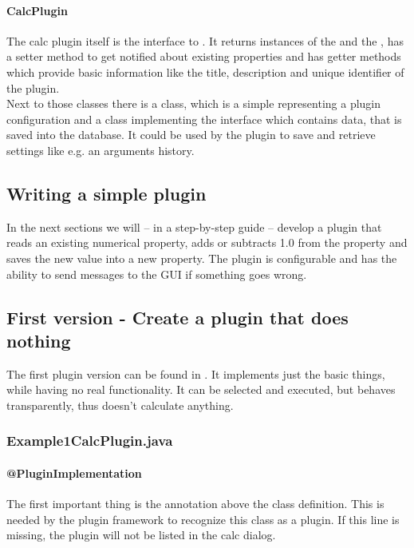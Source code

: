   \paragraph{CalcPlugin}
  The calc plugin itself is the interface to \sh.
  It returns instances of the 
  and the ,
  has a setter method to get notified about existing properties and
  has getter methods which provide basic information like the title,
  description and unique identifier of the plugin.\\

  Next to those classes there is a  class,
  which is a simple  representing a plugin configuration
  and a  class implementing
  the  interface which contains data,
  that is saved into the database.
  It could be used by the plugin to save and retrieve
  settings like e.g. an arguments history.

\subsection{Writing a simple plugin}
In the next sections we will -- in a step-by-step guide --
develop a plugin that reads an existing numerical property,
adds or subtracts 1.0 from the property
and saves the new value into a new property.
The plugin is configurable and has the ability
to send messages to the GUI if something goes wrong.

\subsection{First version - Create a plugin that does nothing}
The first plugin version can be found in
.
It implements just the basic things, while having no real functionality.
It can be selected and executed, but behaves transparently,
thus doesn't calculate anything.

  \subsubsection{Example1CalcPlugin.java}

    \paragraph{@PluginImplementation}
    The first important thing is the 
    annotation above the class definition.
    This is needed by the plugin framework to recognize this class as a plugin.
    If this line is missing, the plugin will not be listed in the calc dialog.

